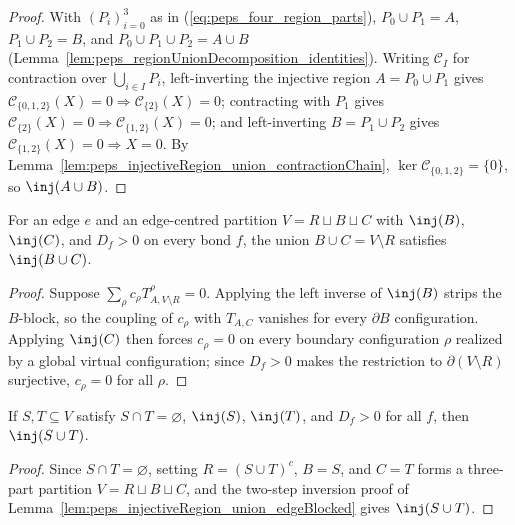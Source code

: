 \begin{proof}
    With $(P_i)_{i=0}^3$ as in (\ref{eq:peps_four_region_parts}),
    $P_0\cup P_1=A$, $P_1\cup P_2=B$, and $P_0\cup P_1\cup P_2=A\cup B$
    (Lemma~\ref{lem:peps_regionUnionDecomposition_identities}). Writing
    $\mathcal C_I$ for contraction over $\bigcup_{i\in I}P_i$, left-inverting
    the injective region $A=P_0\cup P_1$ gives
    $\mathcal C_{\{0,1,2\}}(X)=0\Longrightarrow\mathcal C_{\{2\}}(X)=0$;
    contracting with $P_1$ gives
    $\mathcal C_{\{2\}}(X)=0\Longrightarrow\mathcal C_{\{1,2\}}(X)=0$; and
    left-inverting $B=P_1\cup P_2$ gives
    $\mathcal C_{\{1,2\}}(X)=0\Longrightarrow X=0$. By
    Lemma~\ref{lem:peps_injectiveRegion_union_contractionChain},
    $\ker\mathcal C_{\{0,1,2\}}=\{0\}$, so $\inj(A\cup B)$.
\end{proof}

\begin{lemma}%
    \label{lem:peps_injectiveRegion_union_edgeBlocked}
    \leanok
    For an edge $e$ and an edge-centred partition $V=R\sqcup B\sqcup C$ with
    $\inj(B)$, $\inj(C)$, and $D_f>0$ on every bond $f$, the union
    $B\cup C=V\setminus R$ satisfies $\inj(B\cup C)$.
\end{lemma}
\begin{proof}\leanok
    Suppose $\sum_\rho c_\rho T_{A,V\setminus R}^\rho=0$. Applying the left
    inverse of $\inj(B)$ strips the $B$-block, so the coupling of $c_\rho$ with
    $T_{A,C}$ vanishes for every $\partial B$ configuration. Applying $\inj(C)$
    then forces $c_\rho=0$ on every boundary configuration $\rho$ realized by a
    global virtual configuration; since $D_f>0$ makes the restriction to
    $\partial(V\setminus R)$ surjective, $c_\rho=0$ for all $\rho$.
\end{proof}

\begin{lemma}%
    \label{lem:peps_injectiveRegion_union_disjoint}
    \leanok
    If $S,T\subseteq V$ satisfy $S\cap T=\varnothing$, $\inj(S)$, $\inj(T)$,
    and $D_f>0$ for all $f$, then $\inj(S\cup T)$.
\end{lemma}
\begin{proof}\leanok
    Since $S\cap T=\varnothing$, setting $R=(S\cup T)^c$, $B=S$, and $C=T$
    forms a three-part partition $V=R\sqcup B\sqcup C$, and the two-step
    inversion proof of Lemma~\ref{lem:peps_injectiveRegion_union_edgeBlocked}
    gives $\inj(S\cup T)$.
\end{proof}

